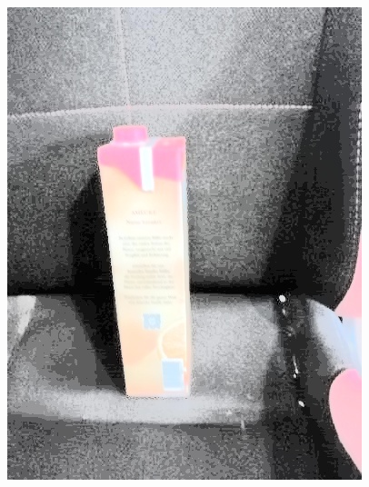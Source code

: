 \begin{appendices}
\begin{figure}[htb]
\begin{minipage}{0.19\textwidth}
\end{minipage}
\begin{minipage}{0.19\textwidth}
\includegraphics[width=\textwidth]{images/anomalien/HA/image157.jpg}
\end{minipage}
\begin{minipage}{0.19\textwidth}

\end{minipage}
\end{figure}
\end{appendices}

